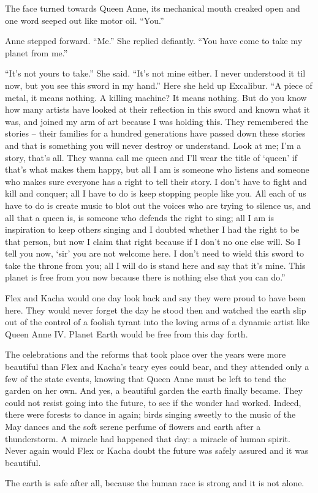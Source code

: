 The face turned towards Queen Anne, its mechanical mouth creaked open
and one word seeped out like motor oil. “You.”

Anne stepped forward. “Me.” She replied defiantly.  “You have come to
take my planet from me.”

“It’s not yours to take.” She said. “It’s not mine either. I never
understood it til now, but you see this sword in my hand.” Here she
held up Excalibur. “A piece of metal, it means nothing. A killing
machine? It means nothing. But do you know how many artists have
looked at their reflection in this sword and known what it was, and
joined my arm of art because I was holding this. They remembered the
stories – their families for a hundred generations have passed down
these stories and that is something you will never destroy or
understand. Look at me; I’m a story, that’s all. They wanna call me
queen and I’ll wear the title of ‘queen’ if that’s what makes them
happy, but all I am is someone who listens and someone who makes sure
everyone has a right to tell their story. I don’t have to fight and
kill and conquer; all I have to do is keep stopping people like
you. All each of us have to do is create music to blot out the voices
who are trying to silence us, and all that a queen is, is someone who
defends the right to sing; all I am is inspiration to keep others
singing and I doubted whether I had the right to be that person, but
now I claim that right because if I don’t no one else will. So I tell
you now, ‘sir’ you are not welcome here. I don’t need to wield this
sword to take the throne from you; all I will do is stand here and say
that it’s mine. This planet is free from you now because there is
nothing else that you can do.”

Flex and Kacha would one day look back and say they were proud to have
been here. They would never forget the day he stood then and watched
the earth slip out of the control of a foolish tyrant into the loving
arms of a dynamic artist like Queen Anne IV. Planet Earth would be
free from this day forth.

The celebrations and the reforms that took place over the years were
more beautiful than Flex and Kacha’s teary eyes could bear, and they
attended only a few of the state events, knowing that Queen Anne must
be left to tend the garden on her own. And yes, a beautiful garden the
earth finally became. They could not resist going into the future, to
see if the wonder had worked. Indeed, there were forests to dance in
again; birds singing sweetly to the music of the May dances and the
soft serene perfume of flowers and earth after a thunderstorm. A
miracle had happened that day: a miracle of human spirit. Never again
would Flex or Kacha doubt the future was safely assured and it was
beautiful.

The earth is safe after all, because the human race is strong and it
is not alone.
